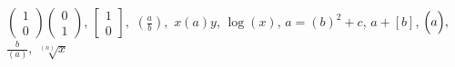 \documentclass{article}
\begin{document}
$\begin{pmatrix} 1 \\ 0 \end{pmatrix}\begin{pmatrix} 0 \\ 1 \end{pmatrix}$,
$\begin{bmatrix} 1 \\ 0 \end{bmatrix},$
$\left(\frac{a}{b}\right),$
$x\left(a\right)y$,
$\log\left(x\right)$,
$a=\left(b\right)^2+c$,
$a+\left[b\right]$,
$\Bigl(a\Bigr),$
$\frac{b}{\left(a\right)}$,
$\sqrt[\left(n\right)]{x}$
\end{document}
